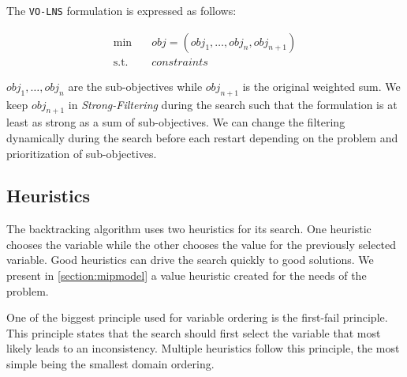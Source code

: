 \documentclass[../../thesis.tex]{subfiles}
\begin{document}
The \texttt{VO-LNS} formulation is expressed as follows:

\begin{align*}
  \text{min} \quad & obj = (obj_1, \dots, obj_n, obj_{n+1}) \\
  \text{s.t.} \quad & constraints 
\end{align*}

$obj_1, \dots, obj_n$ are the sub-objectives while $obj_{n+1}$ is the original weighted sum. We keep $obj_{n+1}$ in 
\emph{Strong-Filtering} during the search such that the formulation is at least as strong as a sum of sub-objectives.
We can change the filtering dynamically during the search before each restart depending on the problem and prioritization of sub-objectives.

\subsection{Heuristics}

The backtracking algorithm uses two heuristics for its search. One heuristic chooses the variable while the other chooses 
the value for the previously selected variable. Good heuristics can drive the search quickly to good solutions. 
We present in \autoref{section:mipmodel} a value heuristic created for the needs of the problem.


One of the biggest principle used for variable ordering is the first-fail principle. 
This principle states that the search should first select the variable that most likely leads to 
an inconsistency. Multiple heuristics follow this principle, the most simple being the smallest domain ordering.
\end{document}
